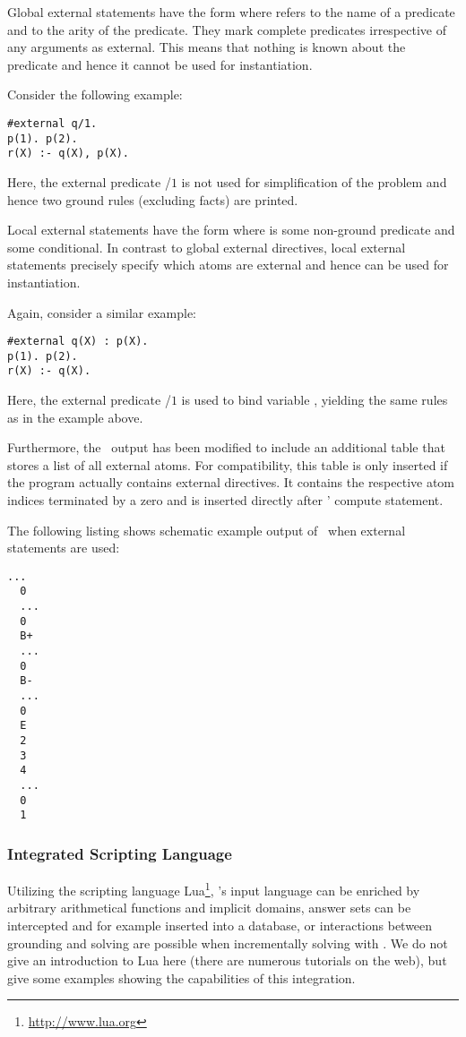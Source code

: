 Global external statements have the form  where 
 refers to the name of a predicate and  to the arity of the predicate.
They mark complete predicates irrespective of any arguments as external.
This means that nothing is known about the predicate and hence it cannot be used 
for instantiation.
\begin{example}
Consider the following example:
\begin{lstlisting}[numbers=none]
#external q/1.
p(1). p(2).
r(X) :- q(X), p(X).
\end{lstlisting}
Here, the external predicate /$1$ is not used for simplification
of the problem and hence two ground rules (excluding facts) are printed.
\eexample
\end{example}

Local external statements have the form  where
 is some non-ground predicate and  some conditional.
In contrast to global external directives, local external statements precisely specify 
which atoms are external and hence can be used for instantiation.
\begin{example}
Again, consider a similar example:
\begin{lstlisting}[numbers=none]
#external q(X) : p(X).
p(1). p(2).
r(X) :- q(X).
\end{lstlisting}
Here, the external predicate /$1$ is used to bind variable , 
yielding the same rules as in the example above.
\eexample
\end{example}

Furthermore, the \lparse\ output\cite{lparseManual} has been modified to include an additional table 
that stores a list  of all external atoms. For compatibility, this table is only inserted if the 
program actually contains external directives. It contains the respective atom indices terminated
by a zero and is inserted directly after \lparse' compute statement.
\begin{example}
The following listing shows schematic example output of \gringo\ when external statements are used:
\begin{lstlisting}[numbers=none]
  ...
  0
  ...
  0
  B+
  ...
  0
  B-
  ...
  0
  E
  2
  3
  4
  ...
  0
  1
\end{lstlisting}
\eexample
\end{example}

\subsubsection{Integrated Scripting Language}\label{subsec:lang:lua}
%
Utilizing the scripting language Lua\footnote{\url{http://www.lua.org}}, 
\gringo's input language can be enriched by arbitrary arithmetical functions and implicit domains,
answer sets can be intercepted and for example inserted into a database, or
interactions between grounding and solving are possible when incrementally solving with \iclingo.
We do not give an introduction to Lua here (there are numerous tutorials on the web), 
but give some examples showing the capabilities of this integration.

